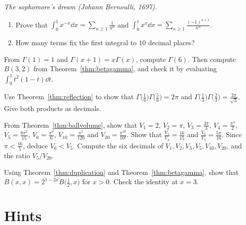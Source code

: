 \begin{exercise}[$\star$]\label{pb:sophomore}
\emph{The sophomore's dream (Johann Bernoulli, 1697).}
\begin{enumerate}[label=(\alph*)]
\item Prove that $\displaystyle\int_0^1x^{-x}\dd x=\sum_{n\ge1}\frac1{n^n}$ and $\displaystyle\int_0^1x^x\dd x=\sum_{n\ge1}\frac{(-1)^{n+1}}{n^n}$.
\item How many terms fix the first integral to $10$ decimal places?
\end{enumerate}
\end{exercise}

\begin{exercise}[$\star$]\label{ex:rw05a}
From $\Gamma(1)=1$ and $\Gamma(x+1)=x\Gamma(x)$, compute $\Gamma(6)$. Then compute $B(3,2)$ from Theorem~\ref{thm:betagamma}, and check it by evaluating $\int_0^1 t^2(1-t)\dd t$.
\end{exercise}

\begin{exercise}[$\star\star$]\label{ex:rw05b}
Use Theorem~\ref{thm:reflection} to show that $\Gamma\bigl(\frac16\bigr)\Gamma\bigl(\frac56\bigr)=2\pi$ and $\Gamma\bigl(\frac13\bigr)\Gamma\bigl(\frac23\bigr)=\frac{2\pi}{\sqrt3}$. Give both products as decimals.
\end{exercise}

\begin{exercise}[$\star\star$]\label{ex:rw05c}
From Theorem~\ref{thm:ballvolume}, show that $V_1=2$, $V_2=\pi$, $V_3=\frac{4\pi}3$, $V_4=\frac{\pi^2}2$, $V_5=\frac{8\pi^2}{15}$, $V_6=\frac{\pi^3}6$, $V_{10}=\frac{\pi^5}{120}$ and $V_{20}=\frac{\pi^{10}}{10!}$. Show that $\frac{V_5}{V_4}=\frac{16}{15}$ and $\frac{V_6}{V_5}=\frac{5\pi}{16}$. Since $\pi<\frac{16}5$, deduce $V_6<V_5$. Compute the six decimals of $V_1,V_2,V_3,V_5,V_{10},V_{20}$, and the ratio $V_5/V_{20}$.
\end{exercise}

\begin{exercise}[$\star\star\star$]\label{ex:rw05d}
Using Theorem~\ref{thm:duplication} and Theorem~\ref{thm:betagamma}, show that $B(x,x)=2^{1-2x}B\bigl(\frac12,x\bigr)$ for $x>0$. Check the identity at $x=3$.
\end{exercise}

\section{Hints}

